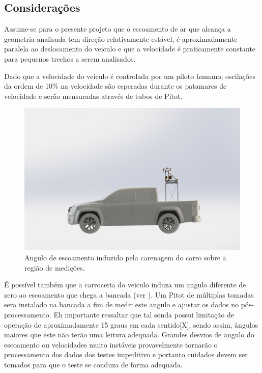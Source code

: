 \subsection{Considerações}

Assume-se para o presente projeto que o escoamento de ar que alcança a geometria analisada tem direção relativamente estável, é aproximadamente paralela ao deslocamento do veiculo e que a velocidade é praticamente constante para pequenos trechos a serem analisados.

Dado que a velocidade do veiculo é controlada por um piloto humano, oscilações da ordem de 10\% na velocidade são esperadas durante os patamares de velocidade e serão mensuradas através de tubos de Pitot.

\begin{figure}[!ht]
    \centering
    \includegraphics[width=.8\linewidth]{figuras/renders/bancada_no_carro_lateral.png}
    \caption{Angulo de escoamento induzido pela carenagem do carro sobre a região de medições\cite{autor}.}
    \label{fig:vehicle-angle}
\end{figure}

É possível também que a carroceria do veiculo induza um angulo diferente de zero ao escoamento que chega a bancada (ver ). Um Pitot de múltiplas tomadas sera instalado na bancada a fim de medir este angulo e ajustar os dados no pós-processamento. Eh importante ressaltar que tal sonda  possui limitação de operação de aproximadamente 15 graus em cada sentido[X], sendo assim, ângulos maiores que este não terão uma leitura adequada. Grandes desvios de angulo do escoamento ou velocidades muito instáveis provavelmente tornarão o processamento dos dados dos testes impeditivo e portanto cuidados devem ser tomados para que o teste se conduza de forma adequada.

